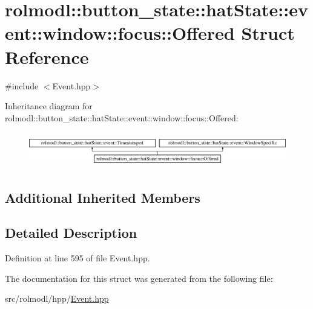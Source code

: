\hypertarget{structrolmodl_1_1button__state_1_1hat_state_1_1event_1_1window_1_1focus_1_1_offered}{}\section{rolmodl\+::button\+\_\+state\+::hat\+State\+::event\+::window\+::focus\+::Offered Struct Reference}
\label{structrolmodl_1_1button__state_1_1hat_state_1_1event_1_1window_1_1focus_1_1_offered}


{\ttfamily \#include $<$Event.\+hpp$>$}

Inheritance diagram for rolmodl\+::button\+\_\+state\+::hat\+State\+::event\+::window\+::focus\+::Offered\+:\begin{figure}[H]
\begin{center}
\leavevmode
\includegraphics[height=1.568627cm]{structrolmodl_1_1button__state_1_1hat_state_1_1event_1_1window_1_1focus_1_1_offered}
\end{center}
\end{figure}
\subsection*{Additional Inherited Members}


\subsection{Detailed Description}


Definition at line 595 of file Event.\+hpp.



The documentation for this struct was generated from the following file\+:\begin{DoxyCompactItemize}
\item 
src/rolmodl/hpp/\mbox{\hyperlink{_event_8hpp}{Event.\+hpp}}\end{DoxyCompactItemize}
